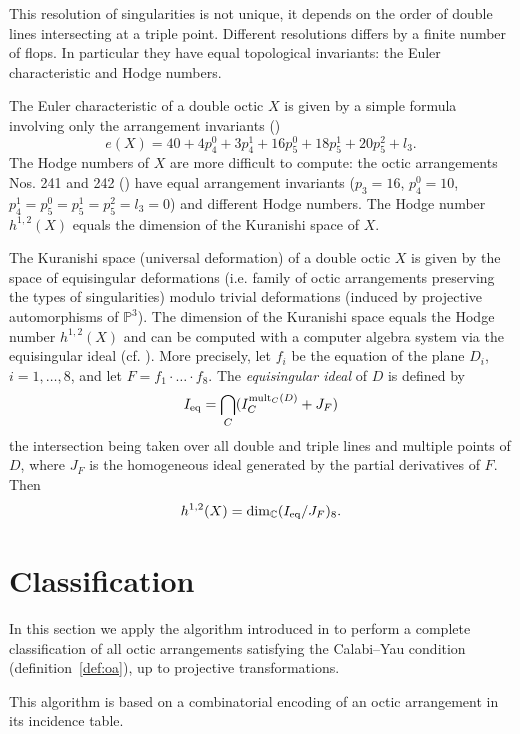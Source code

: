 \documentclass[12pt]{amsart}
\theoremstyle{plain}
\theoremstyle{remark}
\theoremstyle{definition}
\newcommand{\PP}{\mathbb P}
\newcommand\CC{{\mathbb C}}
\numberwithin{table}{section}
\begin{document}
This resolution of singularities is not unique, it depends on the order of double lines intersecting at a triple point. Different resolutions differs by a finite number of flops. In particular they have equal topological invariants: the Euler characteristic and Hodge numbers.

The Euler characteristic of a double octic $X$ is given by a simple formula involving only the arrangement invariants (\cite[Thm.~2.1]{CSz})
\[e(X)=40+4p_{4}^{0}+3p_{4}^{1}+16p_{5}^{0}+18p_{5}^{1}+20p_{5}^{2}+l_{3}.\]
The Hodge numbers of $X$ are more difficult to compute:  the octic  arrangements Nos. 241 and 242 (\cite{Meyer}) have equal arrangement invariants ($p_{3}=16$, $p_{4}^{0}=10$, $p_{4}^{1}=p_{5}^{0}=p_{5}^{1}=p_{5}^{2}=l_{3}=0$) and different Hodge numbers.
The Hodge number $h^{1,2}(X)$ equals the dimension of the Kuranishi space of $X$.

The Kuranishi space (universal deformation) of a double octic $X$ is
given by the space of equisingular deformations (i.e. family of octic
arrangements preserving the types of singularities) modulo trivial
deformations (induced by projective automorphisms of
$\PP^{3}$). The dimension of the Kuranishi space equals the Hodge number
$h^{1,2}(X)$ and can be computed with a computer algebra system via
the equisingular ideal (cf. \cite{CvS}). More precisely, let $f_{i}$
be the equation of the plane
$D_{i}$, $i=1,\dots,8$, and let $F=f_{1}\cdot\ldots\cdot f_{8}$.
The \emph{equisingular ideal} of $D$ is defined by
\[I_{\rm eq}=\bigcap_{C}(I_{C}^{\operatorname{mult}_{C}(D)}+J_{F})
\]
the intersection being taken over all double and triple lines and
multiple points of $D$, where $J_{F}$ is the homogeneous ideal
generated by the partial derivatives  of $F$. Then
\[h^{1,2}(X)=\dim_{\CC}(I_{\rm eq}/J_{F})_{8}.\]

\section{Classification}

\label{sec:cl}
In this section we apply the algorithm introduced in
\cite{CK-C} to perform a complete classification of all octic arrangements satisfying the Calabi--Yau condition (definition~\ref{def:oa}), up to projective transformations.

This algorithm is based on a combinatorial encoding of an octic arrangement in its incidence table.
\end{document}
